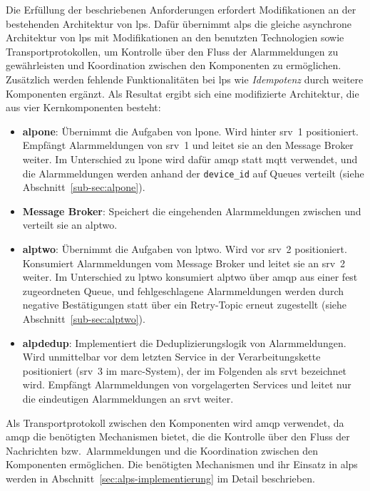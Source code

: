 Die Erfüllung der beschriebenen Anforderungen erfordert Modifikationen an der bestehenden Architektur von \gls{lps}. Dafür übernimmt \gls{alps} die gleiche asynchrone Architektur von \gls{lps} mit Modifikationen an den benutzten Technologien sowie Transportprotokollen, um Kontrolle über den Fluss der Alarmmeldungen zu gewährleisten und Koordination zwischen den Komponenten zu ermöglichen. Zusätzlich werden fehlende Funktionalitäten bei \gls{lps} wie \textit{Idempotenz} durch weitere Komponenten ergänzt. Als Resultat ergibt sich eine modifizierte Architektur, die aus vier Kernkomponenten besteht:

\begin{itemize}
    \item \textbf{\gls{alpone}}: Übernimmt die Aufgaben von \gls{lpone}. Wird hinter \gls{srv}~1 positioniert. Empfängt Alarmmeldungen von \gls{srv}~1 und leitet sie an den Message Broker weiter. Im Unterschied zu \gls{lpone} wird dafür \gls{amqp} statt \gls{mqtt} verwendet, und die Alarmmeldungen werden anhand der \texttt{device\_id} auf Queues verteilt (siehe Abschnitt~\ref{sub-sec:alpone}).
    \item \textbf{Message Broker}: Speichert die eingehenden Alarmmeldungen zwischen und verteilt sie an \acrshort{alptwo}.
    \item \textbf{\gls{alptwo}}: Übernimmt die Aufgaben von \gls{lptwo}. Wird vor \gls{srv}~2 positioniert. Konsumiert Alarmmeldungen vom Message Broker und leitet sie an \gls{srv}~2 weiter. Im Unterschied zu \gls{lptwo} konsumiert \gls{alptwo} über \gls{amqp} aus einer fest zugeordneten Queue, und fehlgeschlagene Alarmmeldungen werden durch negative Bestätigungen statt über ein Retry-Topic erneut zugestellt (siehe Abschnitt~\ref{sub-sec:alptwo}).
    \item \textbf{\gls{alpdedup}}: Implementiert die Deduplizierungslogik von Alarmmeldungen. Wird unmittelbar vor dem letzten Service in der Verarbeitungskette positioniert (\gls{srv}~3 im \gls{marc}-System), der im Folgenden als \gls{srvt} bezeichnet wird. Empfängt Alarmmeldungen von vorgelagerten Services und leitet nur die eindeutigen Alarmmeldungen an \gls{srvt} weiter.
\end{itemize}

Als Transportprotokoll zwischen den Komponenten wird \gls{amqp} verwendet, da \gls{amqp} die benötigten Mechanismen bietet, die die Kontrolle über den Fluss der Nachrichten bzw.~Alarmmeldungen und die Koordination zwischen den Komponenten ermöglichen. Die benötigten Mechanismen und ihr Einsatz in \gls{alps} werden in Abschnitt~\ref{sec:alps-implementierung} im Detail beschrieben.

